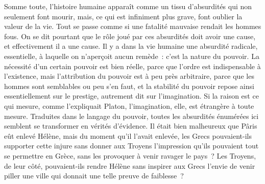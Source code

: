 \documentclass[french,twoside]{book} %
\newif\ifdev
\renewcommand{\LettrineFontHook}{\color{rubric}}
\newcommand{\initialiv}[2]{%
  \let\oldLFH\LettrineFontHook
  \IfSubStr{QJ’}{#1}{
    \lettrine[lines=4, lhang=0.2, loversize=-0.1, lraise=0.2]{\smash{#1}}{#2}
  }{\IfSubStr{É}{#1}{
    \lettrine[lines=4, lhang=0.2, loversize=-0, lraise=0]{\smash{#1}}{#2}
  }{\IfSubStr{ÀÂ}{#1}{
    \lettrine[lines=4, lhang=0.2, loversize=-0, lraise=0, slope=0.6em]{\smash{#1}}{#2}
  }{\IfSubStr{A}{#1}{
    \lettrine[lines=4, lhang=0.2, loversize=0.2, slope=0.6em]{\smash{#1}}{#2}
  }{\IfSubStr{V}{#1}{
    \lettrine[lines=4, lhang=0.2, loversize=0.2, slope=-0.5em]{\smash{#1}}{#2}
  }{
    \lettrine[lines=4, lhang=0.2, loversize=0.2]{\smash{#1}}{#2}
  }}}}}
  \let\LettrineFontHook\oldLFH
}
\renewcommand{\LettrineFontHook}{\bfseries\color{rubric}}
\begin{document}
Somme toute, l'histoire humaine apparaît comme un tissu d'absurdités qui non seulement font mourir, mais, ce qui est infiniment plus grave, font oublier la valeur de la vie. Tout se passe comme si une fatalité mauvaise rendait les hommes fous. On se dit pourtant que le rôle joué par ces absurdités doit avoir une cause, et effectivement il a une cause. Il y a dans la vie humaine une absurdité radicale, essentielle, à laquelle on n'aperçoit aucun remède : c'est la nature du pouvoir. La nécessité d'un certain pouvoir est bien réelle, parce que l'ordre est indispensable à l'existence, mais l'attribution du pouvoir est à peu près arbitraire, parce que les hommes sont semblables ou peu s'en faut, et la stabilité du pouvoir repose ainsi essentiellement sur le prestige, autrement dit sur l'imagination. Si la raison est ce qui mesure, comme l'expliquait Platon, l'imagination, elle, est étrangère à toute mesure. Traduites dans le langage du pouvoir, toutes les absurdités énumérées ici semblent se transformer en vérités d'évidence. Il était bien malheureux que Pâris eût enlevé Hélène, mais du moment qu'il l'avait enlevée, les Grecs pouvaient-ils supporter cette injure sans donner aux Troyens l'impression qu'ils pouvaient tout se permettre en Grèce, sans les provoquer à venir ravager le pays ? Les Troyens, de leur côté, pouvaient-ils rendre Hélène sans inspirer aux Grecs l'envie de venir piller une ville qui donnait une telle preuve de faiblesse ?
 


\ifbooklet
  \newpage\null\thispagestyle{empty}\newpage
\fi

\ifdev %
\fontname\font — \textsc{Les règles du jeu}\par
(\hyperref[utopie]{\underline{Lien}})\par
\noindent \initialiv{A}{lors là}\blindtext\par
\noindent \initialiv{À}{ la bonheur des dames}\blindtext\par
\noindent \initialiv{É}{tonnez-le}\blindtext\par
\noindent \initialiv{Q}{ualitativement}\blindtext\par
\noindent \initialiv{V}{aloriser}\blindtext\par
\Blindtext
\phantomsection
\label{utopie}
\Blinddocument
\fi
\end{document}
